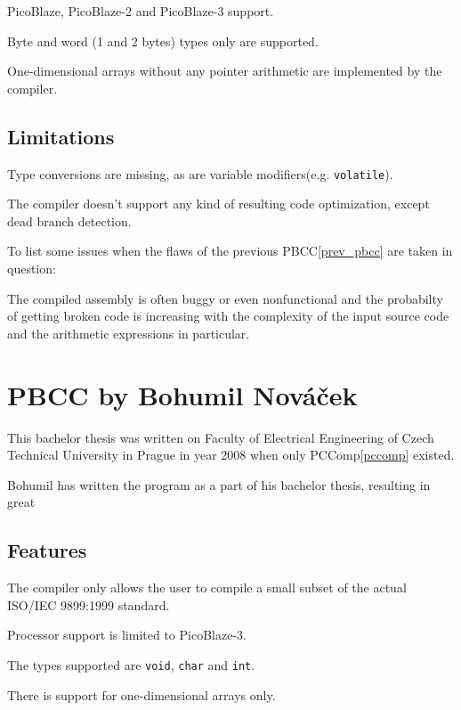         PicoBlaze, PicoBlaze-2 and PicoBlaze-3 support.

        Byte and word (1 and 2 bytes) types only are supported.

        One-dimensional arrays without any pointer arithmetic are implemented by the compiler.

        \subsection{Limitations}

        Type conversions are missing, as are variable modifiers(e.g. \texttt{volatile}). 

        The compiler doesn't support any kind of resulting code optimization, except dead branch detection.

        To list some issues when the flaws of the previous PBCC\ref{prev_pbcc} are taken in question:

        The compiled assembly is often buggy or even nonfunctional and the probabilty of getting broken code is increasing with the complexity of the input source code and the arithmetic expressions in particular.

    \section{PBCC by Bohumil Nováček}\label{not_quite_c}

    This bachelor thesis was written on Faculty of Electrical Engineering of Czech Technical University in Prague in year 2008 when only PCComp\ref{pccomp} existed.

    Bohumil has written the program as a part of his bachelor thesis, resulting in great %

        \subsection{Features}

        The compiler only allows the user to compile a small subset of the actual ISO/IEC 9899:1999 standard.

        Processor support is limited to PicoBlaze-3.

        The types supported are \texttt{void}, \texttt{char} and \texttt{int}.

        There is support for one-dimensional arrays only.

